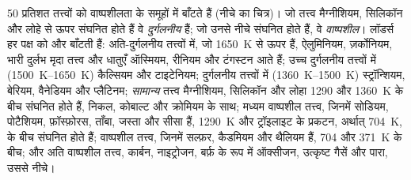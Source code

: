50 प्रतिशत  तत्त्वों को वाष्पशीलता के समूहों में बाँटते हैं (नीचे का चित्र)।
जो तत्त्व मैग्नीशियम, सिलिकॉन और लोहे से ऊपर संघनित होते हैं वे
\emph{दुर्गलनीय} हैं; जो उनसे नीचे संघनित होते हैं, वे \emph{वाष्पशील}।
लॉडर्स हर पक्ष को और बाँटती हैं: अति-दुर्गलनीय तत्त्वों में, जो
\qty{1650}{K} से ऊपर हैं, ऐलुमिनियम, ज़र्कोनियम, भारी दुर्लभ मृदा तत्त्व और धातुएँ
ऑस्मियम, रीनियम और टंगस्टन आते हैं; उच्च दुर्गलनीय तत्त्वों में
(\qtyrange{1500}{1650}{K}) कैल्सियम और टाइटेनियम; दुर्गलनीय तत्त्वों में
(\qtyrange{1360}{1500}{K}) स्ट्रॉन्शियम, बेरियम, वैनेडियम और प्लैटिनम;
\emph{सामान्य}
तत्त्व मैग्नीशियम, सिलिकॉन और लोहा \num{1290} और
\qty{1360}{K} के बीच संघनित होते हैं, निकल, कोबाल्ट और क्रोमियम के साथ; मध्यम
वाष्पशील तत्त्व, जिनमें सोडियम, पोटैशियम, फ़ॉस्फ़ोरस, ताँबा, जस्ता और
सीसा हैं, \qty{1290}{K} और ट्रॉइलाइट के प्रकटन, अर्थात्
\qty{704}{K}, के बीच संघनित होते हैं; वाष्पशील तत्त्व, जिनमें सल्फ़र, कैडमियम और थैलियम हैं,
\num{704} और \qty{371}{K} के बीच; और अति वाष्पशील तत्त्व, कार्बन,
नाइट्रोजन, बर्फ़ के रूप में ऑक्सीजन, उत्कृष्ट गैसें और पारा, उससे नीचे।

